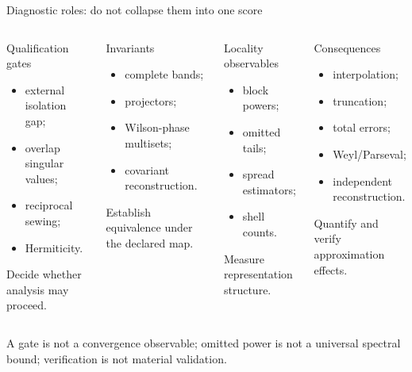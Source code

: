\documentclass[aspectratio=169,10pt]{beamer}
\begin{document}
\begin{frame}{Diagnostic roles: do not collapse them into one score}
  \small
  \begin{columns}[T]
      \begin{alertblock}{Qualification gates}
        \begin{itemize}
          \item external isolation gap;
          \item overlap singular values;
          \item reciprocal sewing;
          \item Hermiticity.
        \end{itemize}
        Decide whether analysis may proceed.
      \end{alertblock}
      \begin{block}{Invariants}
        \begin{itemize}
          \item complete bands;
          \item projectors;
          \item Wilson-phase multisets;
          \item covariant reconstruction.
        \end{itemize}
        Establish equivalence under the declared map.
      \end{block}
      \begin{block}{Locality observables}
        \begin{itemize}
          \item block powers;
          \item omitted tails;
          \item spread estimators;
          \item shell counts.
        \end{itemize}
        Measure representation structure.
      \end{block}
      \begin{block}{Consequences}
        \begin{itemize}
          \item interpolation;
          \item truncation;
          \item total errors;
          \item Weyl/Parseval;
          \item independent reconstruction.
        \end{itemize}
        Quantify and verify approximation effects.
      \end{block}
  \end{columns}

  \vspace{0.4em}
  \centering
  A gate is not a convergence observable; omitted power is not a universal spectral
  bound; verification is not material validation.
\end{frame}
\end{document}
